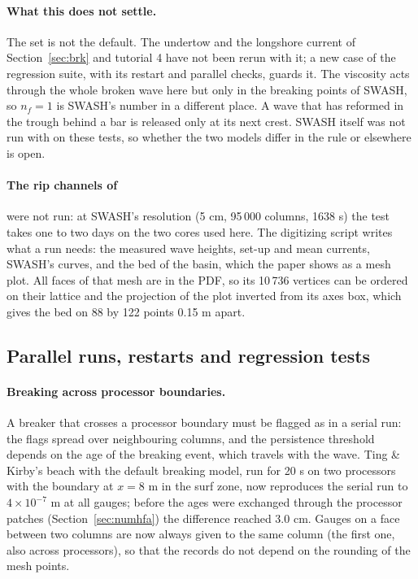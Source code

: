 \paragraph{What this does not settle.} The set is not the default. The
undertow and the longshore current of Section~\ref{sec:brk} and
tutorial 4 have not been rerun with it; a new case of the regression suite,
with its restart and parallel checks, guards it. The viscosity acts
through the whole broken wave here but only in the breaking points of
SWASH, so $n_f = 1$ is SWASH's number in a different place. A wave that
has reformed in the trough behind a bar is released only at its next
crest. SWASH itself was not run with  on these tests, so
whether the two models differ in the rule or elsewhere is open.

\paragraph{The rip channels of \citet{haller2002}} were not run: at
SWASH's resolution (5 cm, 95\,000 columns, 1638 s) the test takes one to
two days on the two cores used here. The digitizing script writes what a
run needs: the measured wave heights, set-up and mean currents, SWASH's
curves, and the bed of the basin, which the paper shows as a mesh plot.
All faces of that mesh are in the PDF, so its 10\,736 vertices can be
ordered on their lattice and the projection of the plot inverted from its
axes box, which gives the bed on 88 by 122 points 0.15 m apart.

\subsection{Parallel runs, restarts and regression tests}
\label{sec:robust}
\label{sec:brk-par}

\paragraph{Breaking across processor boundaries.} A breaker that crosses a
processor boundary must be flagged as in a serial run: the flags spread
over neighbouring columns, and the persistence threshold depends on the age
of the breaking event, which travels with the wave. Ting \& Kirby's beach
with the default breaking model, run for 20 s on two processors with the
boundary at $x = 8$ m in the surf zone, now reproduces the serial run to
$4\times10^{-7}$ m at all gauges; before the ages were exchanged through the
processor patches (Section~\ref{sec:numhfa}) the difference reached 3.0 cm.
Gauges on a face between two columns are now always given to the same
column (the first one, also across processors), so that the records do not
depend on the rounding of the mesh points.

